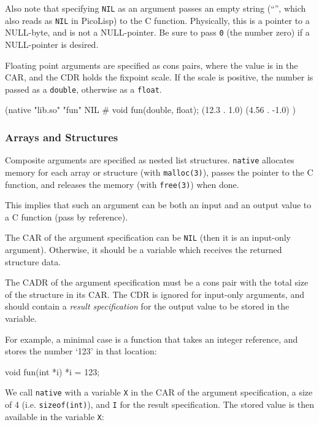 Also note that specifying \texttt{NIL} as an argument passes an empty
string (``'', which also reads as \texttt{NIL} in PicoLisp) to the C
function. Physically, this is a pointer to a NULL-byte, and is not a
NULL-pointer. Be sure to pass \texttt{0} (the number zero) if a
NULL-pointer is desired.

Floating point arguments are specified as cons pairs, where the value is
in the CAR, and the CDR holds the fixpoint scale. If the scale is
positive, the number is passed as a \texttt{double}, otherwise as a
\texttt{float}.

\begin{wideverbatim}
(native "lib.so" "fun" NIL             # void fun(double, float);
   (12.3 . 1.0) (4.56 . -1.0) )
\end{wideverbatim}

\subsubsection{Arrays and Structures}
\label{sec:native-arrays-and-structures}

Composite arguments are specified as nested list structures.
\texttt{native} allocates memory for each array or structure (with
\texttt{malloc(3)}), passes the pointer to the C function, and releases
the memory (with \texttt{free(3)}) when done.

This implies that such an argument can be both an input and an output
value to a C function (pass by reference).

The CAR of the argument specification can be \texttt{NIL} (then it is an
input-only argument). Otherwise, it should be a variable which receives
the returned structure data.

The CADR of the argument specification must be a cons pair with the
total size of the structure in its CAR. The CDR is ignored for
input-only arguments, and should contain a
\emph{result specification} for the output value
to be stored in the variable.

For example, a minimal case is a function that takes an integer
reference, and stores the number `123' in that location:

\begin{wideverbatim}
void fun(int *i) {
   *i = 123;
}
\end{wideverbatim}

We call \texttt{native} with a variable \texttt{X} in the CAR of the
argument specification, a size of 4 (i.e. \texttt{sizeof(int)}), and
\texttt{I} for the result specification. The stored value is then
available in the variable \texttt{X}:

